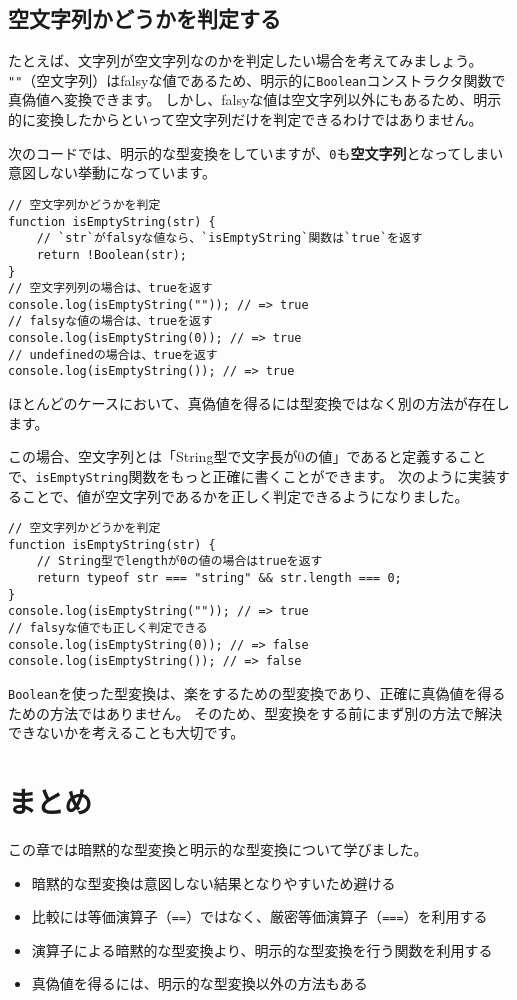 \hypertarget{judge-empty-string}{%
\subsection{空文字列かどうかを判定する}\label{judge-empty-string}}

たとえば、文字列が空文字列なのかを判定したい場合を考えてみましょう。
\texttt{""}（空文字列）はfalsyな値であるため、明示的に\texttt{Boolean}コンストラクタ関数で真偽値へ変換できます。
しかし、falsyな値は空文字列以外にもあるため、明示的に変換したからといって空文字列だけを判定できるわけではありません。

次のコードでは、明示的な型変換をしていますが、\texttt{0}も\textbf{空文字列}となってしまい意図しない挙動になっています。

\begin{lstlisting}
// 空文字列かどうかを判定
function isEmptyString(str) {
    // `str`がfalsyな値なら、`isEmptyString`関数は`true`を返す
    return !Boolean(str);
}
// 空文字列列の場合は、trueを返す
console.log(isEmptyString("")); // => true
// falsyな値の場合は、trueを返す
console.log(isEmptyString(0)); // => true
// undefinedの場合は、trueを返す
console.log(isEmptyString()); // => true
\end{lstlisting}

ほとんどのケースにおいて、真偽値を得るには型変換ではなく別の方法が存在します。

この場合、空文字列とは「String型で文字長が0の値」であると定義することで、\texttt{isEmptyString}関数をもっと正確に書くことができます。
次のように実装することで、値が空文字列であるかを正しく判定できるようになりました。

\begin{lstlisting}
// 空文字列かどうかを判定
function isEmptyString(str) {
    // String型でlengthが0の値の場合はtrueを返す
    return typeof str === "string" && str.length === 0;
}
console.log(isEmptyString("")); // => true
// falsyな値でも正しく判定できる
console.log(isEmptyString(0)); // => false
console.log(isEmptyString()); // => false
\end{lstlisting}

\texttt{Boolean}を使った型変換は、楽をするための型変換であり、正確に真偽値を得るための方法ではありません。
そのため、型変換をする前にまず別の方法で解決できないかを考えることも大切です。

\hypertarget{conclusion}{%
\section{まとめ}\label{conclusion}}

この章では暗黙的な型変換と明示的な型変換について学びました。

\begin{itemize}
\item
  暗黙的な型変換は意図しない結果となりやすいため避ける
\item
  比較には等価演算子（\texttt{==}）ではなく、厳密等価演算子（\texttt{===}）を利用する
\item
  演算子による暗黙的な型変換より、明示的な型変換を行う関数を利用する
\item
  真偽値を得るには、明示的な型変換以外の方法もある
\end{itemize}
